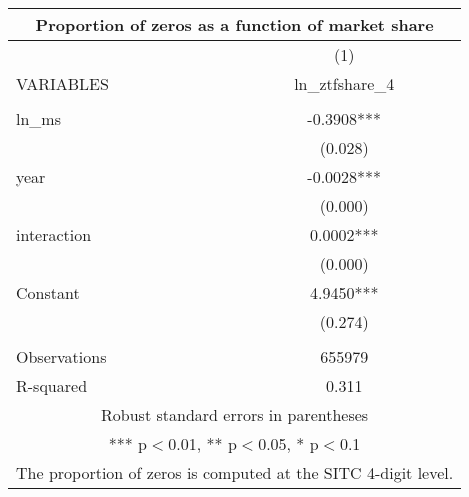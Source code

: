 \begin{tabular}{lc}
\multicolumn{2}{c}{Proportion of zeros as a function of market share} \\ \hline
 & (1) \\
VARIABLES & ln\_ztfshare\_4 \\ \hline
 &  \\
ln\_ms & -0.3908*** \\
 & (0.028) \\
year & -0.0028*** \\
 & (0.000) \\
interaction & 0.0002*** \\
 & (0.000) \\
Constant & 4.9450*** \\
 & (0.274) \\
 &  \\
Observations & 655979 \\
 R-squared & 0.311 \\ \hline
\multicolumn{2}{c}{ Robust standard errors in parentheses} \\
\multicolumn{2}{c}{ *** p$<$0.01, ** p$<$0.05, * p$<$0.1} \\
\multicolumn{2}{c}{ The proportion of zeros is computed at the SITC 4-digit level.} \\
\end{tabular}
